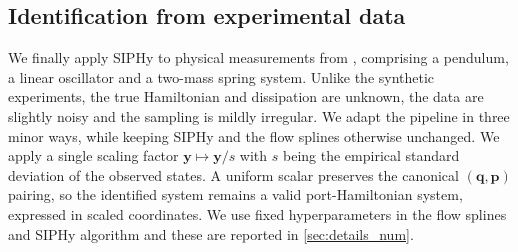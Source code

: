 \documentclass[11pt, a4paper]{article}
\theoremstyle{plain}
\theoremstyle{definition}
\theoremstyle{remark}
\begin{document}
\begin{table}[!t]
  \caption{Port-Hamiltonian systems identified from experimental measurements
\cite{schmidt2009distilling}. Identified 
Hamiltonian $H(\mathbf{y})$, dissipation matrix $\mathbf{R}$, expressed in  scaled
coordinates, together with the rollout error.}
\label{tab:real_data}
\centering
\renewcommand{\arraystretch}{1.25}
\setlength{\tabcolsep}{3pt}
\end{table}







\subsection{Identification from experimental data}
\label{subsec:real_data}





We finally apply SIPHy to physical measurements from \cite{schmidt2009distilling}, comprising a pendulum, a linear oscillator and a two-mass spring system. Unlike the synthetic experiments, the true Hamiltonian and dissipation are unknown, the data are slightly noisy and the sampling is mildly irregular. We adapt the pipeline in three minor ways, while keeping SIPHy and the flow splines otherwise unchanged. We apply a single scaling factor $\mathbf{y} \mapsto \mathbf{y}/s$ with $s$ being the empirical standard deviation of the observed states. A uniform scalar preserves the canonical $(\mathbf{q},\mathbf{p})$ pairing, so the identified system remains a valid port-Hamiltonian system, expressed in scaled coordinates. We use fixed hyperparameters in the flow splines and SIPHy algorithm and these are reported in \cref{sec:details_num}. 
\end{document}
